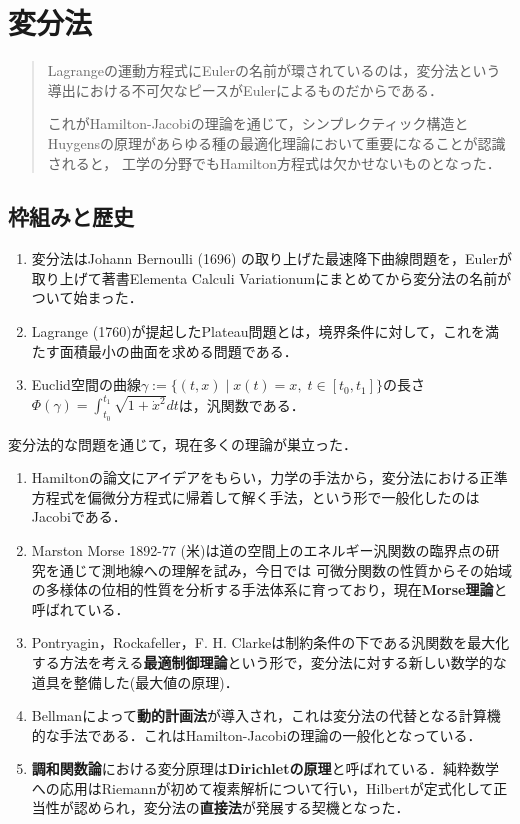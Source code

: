 \documentclass[uplatex, dvipdfmx]{jsreport}
\begin{document}
\chapter{変分法}

\begin{quotation}
    Lagrangeの運動方程式にEulerの名前が環されているのは，変分法という導出における不可欠なピースがEulerによるものだからである．

    これがHamilton-Jacobiの理論を通じて，シンプレクティック構造とHuygensの原理があらゆる種の最適化理論において重要になることが認識されると，
    工学の分野でもHamilton方程式は欠かせないものとなった．
\end{quotation}

\section{枠組みと歴史}

\begin{example}[汎関数の例]\mbox{}
    \begin{enumerate}
        \item 変分法はJohann Bernoulli (1696) の取り上げた最速降下曲線問題を，Eulerが取り上げて著書Elementa Calculi Variationumにまとめてから変分法の名前がついて始まった．
        \item Lagrange (1760)が提起したPlateau問題とは，境界条件に対して，これを満たす面積最小の曲面を求める問題である．
        \item Euclid空間の曲線$\gamma:=\{(t,x)\mid x(t)=x,\; t\in[t_0,t_1]\}$の長さ$\Phi(\gamma)=\int^{t_1}_{t_0}\sqrt{1+\dot{x}^2}dt$は，汎関数である．
    \end{enumerate}
\end{example}
\begin{history}
    変分法的な問題を通じて，現在多くの理論が巣立った．
    \begin{enumerate}
        \item Hamiltonの論文にアイデアをもらい，力学の手法から，変分法における正準方程式を偏微分方程式に帰着して解く手法，という形で一般化したのはJacobiである．
        \item Marston Morse 1892-77 (米)は道の空間上のエネルギー汎関数の臨界点の研究を通じて測地線への理解を試み，今日では
        可微分関数の性質からその始域の多様体の位相的性質を分析する手法体系に育っており，現在\textbf{Morse理論}と呼ばれている．
        \item Pontryagin，Rockafeller，F. H. Clarkeは制約条件の下である汎関数を最大化する方法を考える\textbf{最適制御理論}という形で，変分法に対する新しい数学的な道具を整備した(最大値の原理)．
        \item Bellmanによって\textbf{動的計画法}が導入され，これは変分法の代替となる計算機的な手法である．これはHamilton-Jacobiの理論の一般化となっている．
        \item \textbf{調和関数論}における変分原理は\textbf{Dirichletの原理}と呼ばれている．純粋数学への応用はRiemannが初めて複素解析について行い，Hilbertが定式化して正当性が認められ，変分法の\textbf{直接法}が発展する契機となった．
    \end{enumerate}
\end{history}
\end{document}
